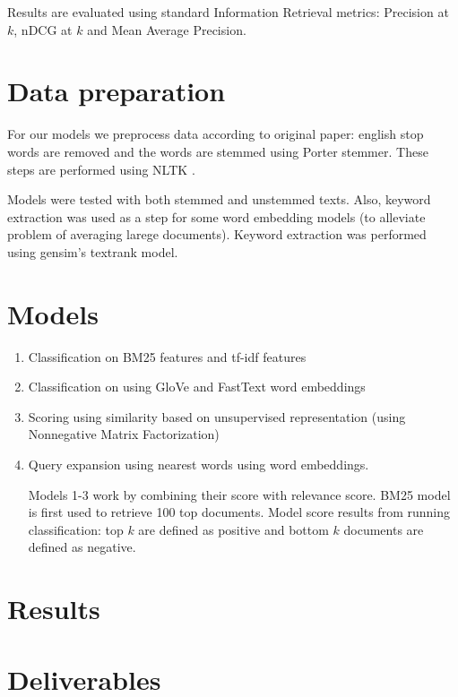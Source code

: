 \documentclass{article}
\begin{document}
Results are evaluated using standard Information Retrieval metrics: Precision at $k$, nDCG at $k$ and Mean Average Precision.

\section{Data preparation} 
For our models we preprocess data according to original paper: english stop words are removed and the words are stemmed using Porter stemmer. These steps are performed using NLTK \citep{Loper02nltk:the}.

Models were tested with both stemmed and unstemmed texts. Also, keyword extraction was used as a step for some word embedding models (to alleviate problem of averaging larege documents). Keyword extraction was performed using gensim's \citep{rehurek_lrec} textrank model.

\section{Models}
 
\begin{enumerate}
  \item Classification on BM25 features and tf-idf features \citep{DBLP:journals/corr/abs-1904-08861}
  \item Classification on using GloVe \citep{Pennington14glove:global} and FastText \citep{bojanowski2016enriching}  word embeddings 
  \item Scoring using similarity based on unsupervised representation (using Nonnegative Matrix Factorization)
  \item Query expansion using nearest words using word embeddings.
  
Models 1-3 work by combining their score with relevance score. BM25 model is first used to retrieve 100 top documents. Model score results from running classification: top $k$ are defined as positive and bottom $k$ documents are defined as negative.
  
\end{enumerate}

\section{Results}

\section{Deliverables}
\end{document}

